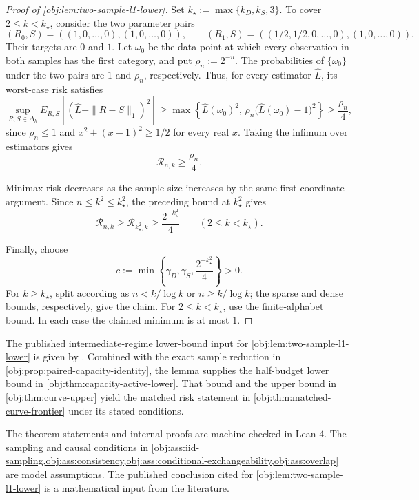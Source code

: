 \documentclass[11pt]{article}
\begin{document}
\begin{proof}[Proof of \cref{obj:lem:two-sample-l1-lower}]
Set \(k_\star:=\max\{k_D,k_S,3\}\). To cover \(2\leq k<k_\star\), consider the two parameter pairs
\[
(R_0,S)=((1,0,\ldots,0),(1,0,\ldots,0)),
\qquad
(R_1,S)=((1/2,1/2,0,\ldots,0),(1,0,\ldots,0)).
\]
Their targets are \(0\) and \(1\). Let \(\omega_0\) be the data point at which every observation in both samples has the first category, and put \(\rho_n:=2^{-n}\). The probabilities of \(\{\omega_0\}\) under the two pairs are \(1\) and \(\rho_n\), respectively. Thus, for every estimator \(\widehat L\), its worst-case risk satisfies
\[
\sup_{R,S\in\Delta_k}E_{R,S}\!\left[(\widehat L-\|R-S\|_1)^2\right]
\geq
\max\!\left\{\widehat L(\omega_0)^2,\,
\rho_n\bigl(\widehat L(\omega_0)-1\bigr)^2\right\}
\geq \frac{\rho_n}{4},
\]
since \(\rho_n\leq1\) and \(x^2+(x-1)^2\geq1/2\) for every real \(x\). Taking the infimum over estimators gives
\[
\mathcal R_{n,k}\geq\frac{\rho_n}{4}.
\] %

Minimax risk decreases as the sample size increases by the same first-coordinate argument. Since \(n\leq k^2\leq k_\star^2\), the preceding bound at \(k_\star^2\) gives
\[
\mathcal R_{n,k}\geq
\mathcal R_{k_\star^2,k}\geq
\frac{2^{-k_\star^2}}4
\qquad(2\leq k<k_\star).
\] %

Finally, choose
\[
c:=\min\left\{\gamma_D,\gamma_S,\frac{2^{-k_\star^2}}4\right\}>0.
\]
For \(k\geq k_\star\), split according as \(n<k/\log k\) or \(n\geq k/\log k\); the sparse and dense bounds, respectively, give the claim. For \(2\leq k<k_\star\), use the finite-alphabet bound. In each case the claimed minimum is at most \(1\). %
\end{proof}

The published intermediate-regime lower-bound input for \cref{obj:lem:two-sample-l1-lower} is given by \citet[Theorem 3 and the unknown-both-distributions reduction following Theorem 6]{JiaoHanWeissman2018}. Combined with the exact sample reduction in \cref{obj:prop:paired-capacity-identity}, the lemma supplies the half-budget lower bound in \cref{obj:thm:capacity-active-lower}. That bound and the upper bound in \cref{obj:thm:curve-upper} yield the matched risk statement in \cref{obj:thm:matched-curve-frontier} under its stated conditions.

The theorem statements and internal proofs are machine-checked in Lean 4. The sampling and causal conditions in \cref{obj:ass:iid-sampling,obj:ass:consistency,obj:ass:conditional-exchangeability,obj:ass:overlap} are model assumptions. The published conclusion cited for \cref{obj:lem:two-sample-l1-lower} is a mathematical input from the literature.
\end{document}
